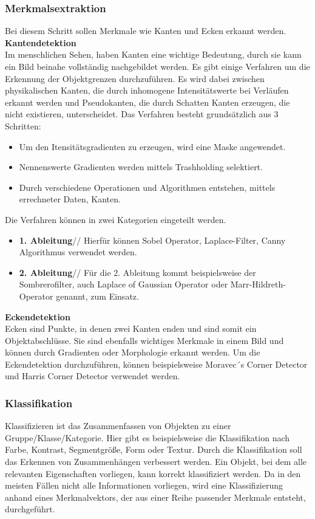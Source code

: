     \subsubsection{Merkmalsextraktion}
    Bei diesem Schritt sollen Merkmale wie Kanten und Ecken erkannt werden.
    \textbf{Kantendetektion}\\
    Im menschlichen Sehen, haben Kanten eine wichtige Bedeutung, durch sie kann ein Bild beinahe vollständig nachgebildet werden. Es gibt einige Verfahren um die Erkennung der Objektgrenzen durchzuführen. Es wird dabei zwischen physikalischen Kanten, die durch inhomogene Intensitätswerte bei Verläufen erkannt werden und Pseudokanten, die durch Schatten Kanten erzeugen, die nicht existieren, unterscheidet.
    Das Verfahren besteht grundsätzlich aus 3 Schritten:
    \begin{itemize}
        \item Um den Itensitätsgradienten zu erzeugen, wird eine Maske angewendet.
        \item Nennenswerte Gradienten werden mittels Trashholding selektiert.
        \item Durch verschiedene Operationen und Algorithmen entstehen, mittels errechneter Daten, Kanten.
    \end{itemize}
    Die Verfahren können in zwei Kategorien eingeteilt werden. 
    \begin{itemize}
        \item \textbf{1. Ableitung}//
        Hierfür können Sobel Operator, Laplace-Filter, Canny Algorithmus verwendet werden.
        \item \textbf{2. Ableitung}//
        Für die 2. Ableitung kommt beispielsweise der Sombrerofilter, auch Laplace of Gaussian Operator oder Marr-Hildreth-Operator genannt, zum Einsatz.
    \end{itemize}
    \textbf{Eckendetektion}\\
    Ecken sind Punkte, in denen zwei Kanten enden und sind somit ein Objektabschlüsse. Sie sind ebenfalls wichtiges Merkmale in einem Bild und können durch Gradienten oder Morphologie erkannt werden. Um die Eckendetektion durchzuführen, können beispielsweise Moravec´s Corner Detector und Harris Corner Detector verwendet werden. \cite{Bildverarbeitung}

    \subsubsection{Klassifikation} 
    Klassifizieren ist das Zusammenfassen von Objekten zu einer Gruppe/Klasse/Kategorie. Hier gibt es beispielsweise die Klassifikation nach Farbe, Kontrast, Segmentgröße, Form oder Textur. Durch die Klassifikation soll das Erkennen von Zusammenhängen verbessert werden. Ein Objekt, bei dem alle relevanten Eigenschaften vorliegen, kann korrekt klassifiziert werden. Da in den meisten Fällen nicht alle Informationen vorliegen, wird eine Klassifizierung anhand eines Merkmalvektors, der aus einer Reihe passender Merkmale entsteht, durchgeführt. \cite{Bildverarbeitung}

